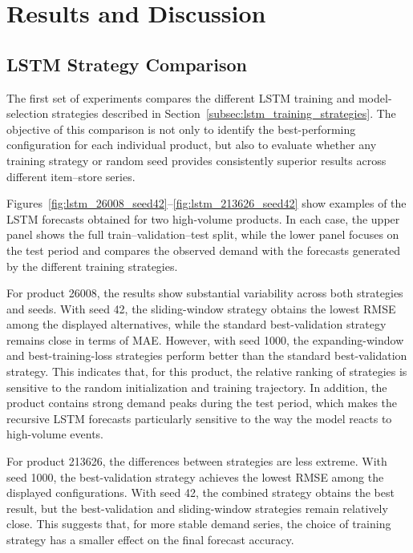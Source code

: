 \section{Results and Discussion}
\subsection{LSTM Strategy Comparison}
\label{subsec:lstm_results_strategy_comparison}

The first set of experiments compares the different LSTM training and model-selection strategies described in Section~\ref{subsec:lstm_training_strategies}. The objective of this comparison is not only to identify the best-performing configuration for each individual product, but also to evaluate whether any training strategy or random seed provides consistently superior results across different item--store series.

Figures~\ref{fig:lstm_26008_seed42}--\ref{fig:lstm_213626_seed42} show examples of the LSTM forecasts obtained for two high-volume products. In each case, the upper panel shows the full train--validation--test split, while the lower panel focuses on the test period and compares the observed demand with the forecasts generated by the different training strategies.

For product 26008, the results show substantial variability across both strategies and seeds. With seed 42, the sliding-window strategy obtains the lowest RMSE among the displayed alternatives, while the standard best-validation strategy remains close in terms of MAE. However, with seed 1000, the expanding-window and best-training-loss strategies perform better than the standard best-validation strategy. This indicates that, for this product, the relative ranking of strategies is sensitive to the random initialization and training trajectory. In addition, the product contains strong demand peaks during the test period, which makes the recursive LSTM forecasts particularly sensitive to the way the model reacts to high-volume events.

For product 213626, the differences between strategies are less extreme. With seed 1000, the best-validation strategy achieves the lowest RMSE among the displayed configurations. With seed 42, the combined strategy obtains the best result, but the best-validation and sliding-window strategies remain relatively close. This suggests that, for more stable demand series, the choice of training strategy has a smaller effect on the final forecast accuracy.

